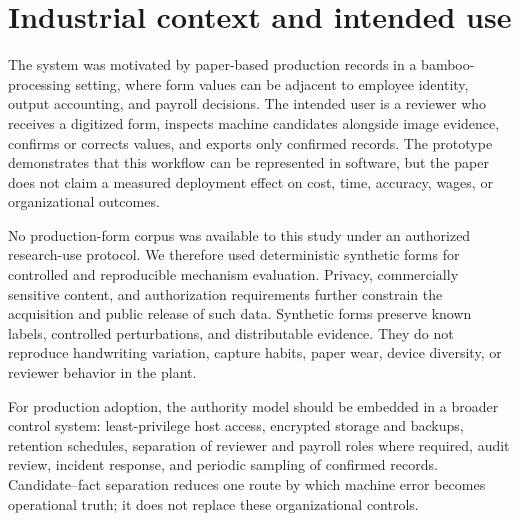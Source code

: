 \section{Industrial context and intended use}
\label{sec:context}

The system was motivated by paper-based production records in a bamboo-processing setting, where form values can be adjacent to employee identity, output accounting, and payroll decisions. The intended user is a reviewer who receives a digitized form, inspects machine candidates alongside image evidence, confirms or corrects values, and exports only confirmed records. The prototype demonstrates that this workflow can be represented in software, but the paper does not claim a measured deployment effect on cost, time, accuracy, wages, or organizational outcomes.

No production-form corpus was available to this study under an authorized research-use protocol. We therefore used deterministic synthetic forms for controlled and reproducible mechanism evaluation. Privacy, commercially sensitive content, and authorization requirements further constrain the acquisition and public release of such data. Synthetic forms preserve known labels, controlled perturbations, and distributable evidence. They do not reproduce handwriting variation, capture habits, paper wear, device diversity, or reviewer behavior in the plant.

For production adoption, the authority model should be embedded in a broader control system: least-privilege host access, encrypted storage and backups, retention schedules, separation of reviewer and payroll roles where required, audit review, incident response, and periodic sampling of confirmed records. Candidate--fact separation reduces one route by which machine error becomes operational truth; it does not replace these organizational controls.
